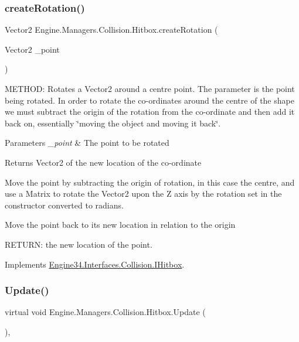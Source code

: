 \subsubsection{\texorpdfstring{create\+Rotation()}{createRotation()}}
{\footnotesize\ttfamily Vector2 Engine.\+Managers.\+Collision.\+Hitbox.\+create\+Rotation (\begin{DoxyParamCaption}\item[{Vector2}]{\+\_\+point }\end{DoxyParamCaption})\hspace{0.3cm}{\ttfamily [inline]}}



M\+E\+T\+H\+OD\+: Rotates a Vector2 around a centre point. The parameter is the point being rotated. In order to rotate the co-\/ordinates around the centre of the shape we must subtract the origin of the rotation from the co-\/ordinate and then add it back on, essentially \char`\"{}moving the object and moving it back\char`\"{}. 


\begin{DoxyParams}{Parameters}
{\em \+\_\+point} & The point to be rotated\\
\hline
\end{DoxyParams}
\begin{DoxyReturn}{Returns}
Vector2 of the new location of the co-\/ordinate
\end{DoxyReturn}
Move the point by subtracting the origin of rotation, in this case the centre, and use a Matrix to rotate the Vector2 upon the Z axis by the rotation set in the constructor converted to radians.

Move the point back to it\textquotesingle{}s new location in relation to the origin

R\+E\+T\+U\+RN\+: the new location of the point. 

Implements \hyperlink{a00434_a88740a6f4bc38fab5c8a58ca80f70aa7}{Engine34.\+Interfaces.\+Collision.\+I\+Hitbox}.

\mbox{\label{a00506_a987b7fd544e03a9e43e38cc2df785d1d}} 
\subsubsection{\texorpdfstring{Update()}{Update()}}
{\footnotesize\ttfamily virtual void Engine.\+Managers.\+Collision.\+Hitbox.\+Update (\begin{DoxyParamCaption}{ }\end{DoxyParamCaption})\hspace{0.3cm}{\ttfamily [inline]}, {\ttfamily [virtual]}}



